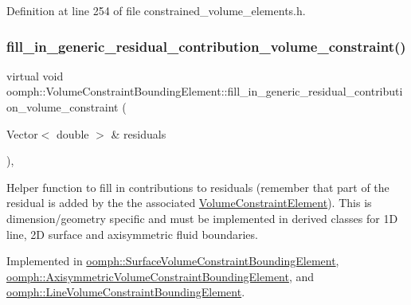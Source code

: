 Definition at line 254 of file constrained\+\_\+volume\+\_\+elements.\+h.

\mbox{\label{classoomph_1_1VolumeConstraintBoundingElement_a717f1085709bd8820b8043ff94ecb0c5}} 
\subsubsection{\texorpdfstring{fill\+\_\+in\+\_\+generic\+\_\+residual\+\_\+contribution\+\_\+volume\+\_\+constraint()}{fill\_in\_generic\_residual\_contribution\_volume\_constraint()}}
{\footnotesize\ttfamily virtual void oomph\+::\+Volume\+Constraint\+Bounding\+Element\+::fill\+\_\+in\+\_\+generic\+\_\+residual\+\_\+contribution\+\_\+volume\+\_\+constraint (\begin{DoxyParamCaption}\item[{Vector$<$ double $>$ \&}]{residuals }\end{DoxyParamCaption})\hspace{0.3cm}{\ttfamily [protected]}, {}}



Helper function to fill in contributions to residuals (remember that part of the residual is added by the the associated \hyperlink{classoomph_1_1VolumeConstraintElement}{Volume\+Constraint\+Element}). This is dimension/geometry specific and must be implemented in derived classes for 1D line, 2D surface and axisymmetric fluid boundaries. 



Implemented in \hyperlink{classoomph_1_1SurfaceVolumeConstraintBoundingElement_a5813fa65063eb55a5b264539d77cac88}{oomph\+::\+Surface\+Volume\+Constraint\+Bounding\+Element}, \hyperlink{classoomph_1_1AxisymmetricVolumeConstraintBoundingElement_a2a3f3b86079f27d52679f357f5276d91}{oomph\+::\+Axisymmetric\+Volume\+Constraint\+Bounding\+Element}, and \hyperlink{classoomph_1_1LineVolumeConstraintBoundingElement_a03145a064e559d786f730c85000f9fb4}{oomph\+::\+Line\+Volume\+Constraint\+Bounding\+Element}.

